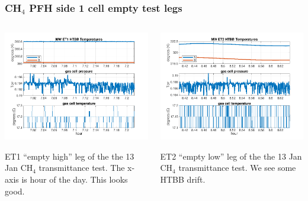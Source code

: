 \documentclass[10pt]{beamer}
\begin{document}
\begin{frame}
\frametitle{CH$_4$ PFH side 1 cell empty test legs}
\begin{columns}[t]
\begin{column}{0.5\textwidth}
  \begin{centering}
  \includegraphics[width=\textwidth]{harvest_01-12/01-13_MW_ET1.png}
  \end{centering}\vspace{3mm}

  ET1 ``empty high'' leg of the the 13 Jan CH$_4$ transmittance test.
  The x-axis is hour of the day.  This looks good.

\end{column}
\begin{column}{0.5\textwidth}  
  \begin{centering}
  \includegraphics[width=\textwidth]{harvest_01-12/01-13_MW_ET2.png}
  \end{centering}\vspace{3mm}

  ET2 ``empty low'' leg of the the 13 Jan CH$_4$ transmittance test.
  We see some HTBB drift.

\end{column}
\end{columns}
\end{frame}
\end{document}
